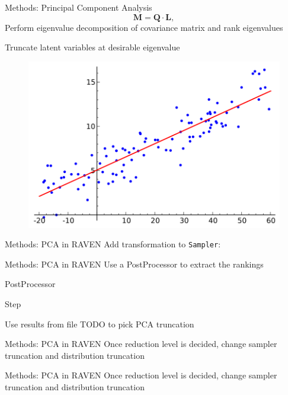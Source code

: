 \documentclass[t,9pt,svgnames]{beamer}
\newcommand{\code}[1]{\texttt{#1}}
\begin{document}
\begin{frame}{Methods: Principal Component Analysis}
  \vfill
  \begin{equation}
    \bm{M} = \bm{Q} \cdot \bm{L},
  \end{equation}
  \vfill
  Perform eigenvalue decomposition of covariance matrix and rank eigenvalues
  \vfill

  Truncate latent variables at desirable eigenvalue
  \vfill
      \begin{figure}
        \includegraphics[width=0.4\linewidth]{pics/pca.png}
      \end{figure}
  \vfill
\end{frame}

\begin{frame}[fragile]{Methods: PCA in RAVEN}
  \vfill
Add transformation to \code{Sampler}:

  \vfill
\end{frame}

\begin{frame}[fragile]{Methods: PCA in RAVEN}
  \vfill
  Use a PostProcessor to extract the rankings
  \vfill

  PostProcessor

  \vfill
  Step

  \vfill
Use results from file TODO to pick PCA truncation
  \vfill
\end{frame}

\begin{frame}[fragile]{Methods: PCA in RAVEN}
  \vfill
  Once reduction level is decided, change sampler truncation and distribution truncation
  
  \vfill
\end{frame}

\begin{frame}[fragile]{Methods: PCA in RAVEN}
  \vfill
  Once reduction level is decided, change sampler truncation and distribution truncation
  
  \vfill
\end{frame}
\end{document}
